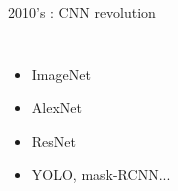 \documentclass{irdbeamer}
\begin{document}
\begin{frame}[t]{2010's : CNN revolution}
\begin{columns}[t]
    \vspace{1cm}
    \begin{itemize}
        \item<1-> ImageNet \citep{deng2009imagenet}
        \item<2-> AlexNet \citep{krizhevsky2012imagenet}
        \item<3-> ResNet \citep{he2016deep}
        \item<5-> YOLO, mask-RCNN... \citep{redmon2016you,he2017mask}
    \end{itemize}
\end{columns}
\end{frame}
\end{document}

